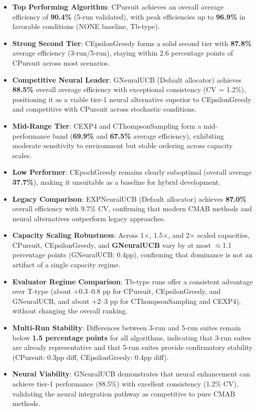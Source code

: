 \documentclass[12pt,a4paper]{article}
\newcommand{\performance}[1]{\textcolor{performancecolor}{\textbf{#1}}}
\newcommand{\critical}[1]{\textcolor{criticalcolor}{\textbf{#1}}}
\newcommand{\success}[1]{\textcolor{successcolor}{\textbf{#1}}}
\newcommand{\legacy}[1]{\textcolor{legacycolor}{\textbf{#1}}}
\newcommand{\neural}[1]{\textcolor{neuralcolor}{\textbf{#1}}}
\begin{document}
\begin{tcolorbox}[colback=highlightcolor!30,colframe=performancecolor,title=\textbf{Key Experimental Results Summary (3-run/5-run, 1$\times$–2$\times$ Capacities, T/Tb Regimes)}]
\begin{itemize}
\item \performance{Top Performing Algorithm}: CPursuit achieves an overall average efficiency of \textbf{90.4\%} (5-run validated), with peak efficiencies up to \textbf{96.9\%} in favorable conditions (NONE baseline, Tb-type).
\item \performance{Strong Second Tier}: CEpsilonGreedy forms a solid second tier with \textbf{87.8\%} average efficiency (3-run/5-run), staying within 2.6 percentage points of CPursuit across most scenarios.
\item \neural{Competitive Neural Leader}: GNeuralUCB (Default allocator) achieves \textbf{88.5\%} overall average efficiency with exceptional consistency (CV = 1.2\%), positioning it as a viable tier-1 neural alternative superior to CEpsilonGreedy and competitive with CPursuit across stochastic conditions.
\item \performance{Mid-Range Tier}: CEXP4 and CThompsonSampling form a mid-performance band (\textbf{69.9\%} and \textbf{67.5\%} average efficiency), exhibiting moderate sensitivity to environment but stable ordering across capacity scales.
\item \critical{Low Performer}: CEpochGreedy remains clearly suboptimal (overall average \textbf{37.7\%}), making it unsuitable as a baseline for hybrid development.
\item \legacy{Legacy Comparison}: EXPNeuralUCB (Default allocator) achieves \textbf{87.0\%} overall efficiency with 9.7\% CV, confirming that modern CMAB methods and neural alternatives outperform legacy approaches.
\item \success{Capacity Scaling Robustness}: Across 1$\times$, 1.5$\times$, and 2$\times$ scaled capacities, CPursuit, CEpsilonGreedy, and \neural{GNeuralUCB} vary by at most $\approx$1.1 percentage points (GNeuralUCB: 0.4pp), confirming that dominance is not an artifact of a single capacity regime.
\item \success{Evaluator Regime Comparison}: Tb-type runs offer a consistent advantage over T-type (about $+0.3$--$0.8$ pp for CPursuit, CEpsilonGreedy, and GNeuralUCB, and about $+2$--$3$ pp for CThompsonSampling and CEXP4), without changing the overall ranking.
\item \success{Multi-Run Stability}: Differences between 3-run and 5-run suites remain below \textbf{1.5 percentage points} for all algorithms, indicating that 3-run suites are already representative and that 5-run suites provide confirmatory stability (CPursuit: 0.3pp diff, CEpsilonGreedy: 0.4pp diff).
\item \neural{Neural Viability}: GNeuralUCB demonstrates that neural enhancement can achieve tier-1 performance (88.5\%) with excellent consistency (1.2\% CV), validating the neural integration pathway as competitive to pure CMAB methods.
\end{itemize}
\end{tcolorbox}
\end{document}
